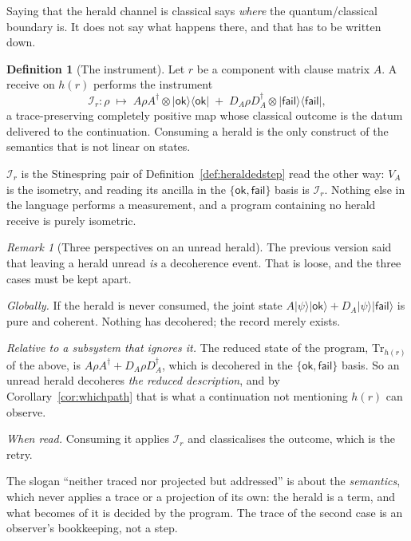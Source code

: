 \documentclass[11pt,a4paper]{article}
\theoremstyle{plain}
\theoremstyle{definition}
\newtheorem{definition}[theorem]{Definition}
\theoremstyle{remark}
\newtheorem{remark}[theorem]{Remark}
\newcommand{\ket}[1]{\lvert #1 \rangle}
\newcommand{\bra}[1]{\langle #1 \rvert}
\begin{document}
Saying that the herald channel is classical says \emph{where} the quantum/classical
boundary is. It does not say what happens there, and that has to be written down.

\begin{definition}[The instrument]\label{def:instrument}
Let $r$ be a component with clause matrix $A$. A receive on $h(r)$ performs the
instrument
\[
  \mathcal{I}_r : \rho \;\longmapsto\;
    A\rho A^{\dagger} \otimes \ket{\mathsf{ok}}\bra{\mathsf{ok}}
  \;+\;
    D_A\rho D_A^{\dagger} \otimes \ket{\mathsf{fail}}\bra{\mathsf{fail}},
\]
a trace-preserving completely positive map whose classical outcome is the datum
delivered to the continuation. Consuming a herald is the only construct of the
semantics that is not linear on states.
\end{definition}

$\mathcal{I}_r$ is the Stinespring pair of Definition~\ref{def:heraldedstep}
read the other way: $V_A$ is the isometry, and reading its ancilla in the
$\{\mathsf{ok},\mathsf{fail}\}$ basis is $\mathcal{I}_r$. Nothing else in the
language performs a measurement, and a program containing no herald receive is
purely isometric.

\begin{remark}[Three perspectives on an unread herald]\label{rem:uncompute}
The previous version said that leaving a herald unread \emph{is} a decoherence
event. That is loose, and the three cases must be kept apart.

\emph{Globally.} If the herald is never consumed, the joint state
$A\ket{\psi}\ket{\mathsf{ok}} + D_A\ket{\psi}\ket{\mathsf{fail}}$ is pure and
coherent. Nothing has decohered; the record merely exists.

\emph{Relative to a subsystem that ignores it.} The reduced state of the
program, $\mathrm{Tr}_{h(r)}$ of the above, is
$A\rho A^{\dagger} + D_A\rho D_A^{\dagger}$, which is decohered in the
$\{\mathsf{ok},\mathsf{fail}\}$ basis. So an unread herald decoheres
\emph{the reduced description}, and by Corollary~\ref{cor:whichpath} that is
what a continuation not mentioning $h(r)$ can observe.

\emph{When read.} Consuming it applies $\mathcal{I}_r$ and classicalises the
outcome, which is the retry.

The slogan ``neither traced nor projected but addressed'' is about the
\emph{semantics}, which never applies a trace or a projection of its own: the
herald is a term, and what becomes of it is decided by the program. The trace of
the second case is an observer's bookkeeping, not a step.
\end{remark}
\end{document}
